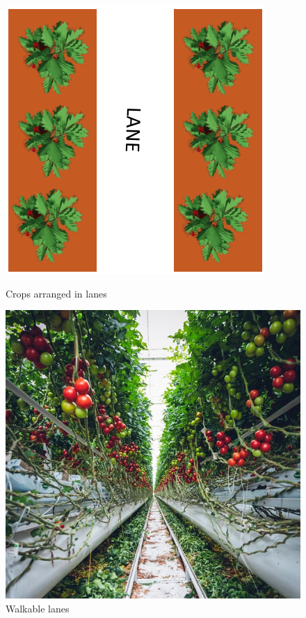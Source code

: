 \begin{figure}[H]
    \centering
    \begin{minipage}[b]{0.47\textwidth}
        \includegraphics[width=\textwidth]{user-view/lanes.png}
        \caption{Crops arranged in lanes}
        \label{fig:lane1}
    \end{minipage}
    \hfill
    \begin{minipage}[b]{0.49\textwidth}
        \includegraphics[width=\textwidth]{user-view/plant1_markus_spiske_unsplash.jpg}
        \caption{Walkable lanes}
        \label{fig:lane2}
    \end{minipage}
\end{figure}

